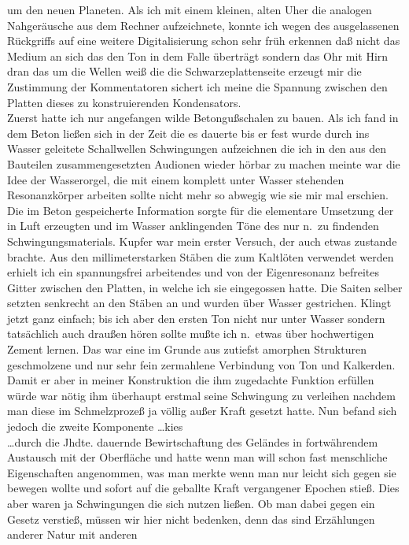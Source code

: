 \documentclass[
]{article}
\begin{document}
um den neuen Planeten. Als ich mit einem kleinen, alten Uher die
analogen Nahgeräusche aus dem Rechner aufzeichnete, konnte ich wegen des
ausgelassenen Rückgriffs auf eine weitere Digitalisierung schon sehr
früh erkennen daß nicht das Medium an sich das den Ton in dem Falle
überträgt sondern das Ohr mit Hirn dran das um die Wellen weiß die die
Schwarzeplattenseite erzeugt mir die Zustimmung der Kommentatoren
sichert ich meine die Spannung zwischen den Platten dieses zu
konstruierenden Kondensators.\\
Zuerst hatte ich nur angefangen wilde Betongußschalen zu bauen. Als ich
fand in dem Beton ließen sich in der Zeit die es dauerte bis er fest
wurde durch ins Wasser geleitete Schallwellen Schwingungen aufzeichnen
die ich in den aus den Bauteilen zusammengesetzten Audionen wieder
hörbar zu machen meinte war die Idee der Wasserorgel, die mit einem
komplett unter Wasser stehenden Resonanzkörper arbeiten sollte nicht
mehr so abwegig wie sie mir mal erschien. Die im Beton gespeicherte
Information sorgte für die elementare Umsetzung der in Luft erzeugten
und im Wasser anklingenden Töne des nur n.~zu findenden
Schwingungsmaterials. Kupfer war mein erster Versuch, der auch etwas
zustande brachte. Aus den millimeterstarken Stäben die zum Kaltlöten
verwendet werden erhielt ich ein spannungsfrei arbeitendes und von der
Eigenresonanz befreites Gitter zwischen den Platten, in welche ich sie
eingegossen hatte. Die Saiten selber setzten senkrecht an den Stäben an
und wurden über Wasser gestrichen. Klingt jetzt ganz einfach; bis ich
aber den ersten Ton nicht nur unter Wasser sondern tatsächlich auch
draußen hören sollte mußte ich n.~etwas über hochwertigen Zement lernen.
Das war eine im Grunde aus zutiefst amorphen Strukturen geschmolzene und
nur sehr fein zermahlene Verbindung von Ton und Kalkerden. Damit er aber
in meiner Konstruktion die ihm zugedachte Funktion erfüllen würde war
nötig ihm überhaupt erstmal seine Schwingung zu verleihen nachdem man
diese im Schmelzprozeß ja völlig außer Kraft gesetzt hatte. Nun befand
sich jedoch die zweite Komponente \ldots kies\\
\ldots durch die Jhdte. dauernde Bewirtschaftung des Geländes in
fortwährendem Austausch mit der Oberfläche und hatte wenn man will schon
fast menschliche Eigenschaften angenommen, was man merkte wenn man nur
leicht sich gegen sie bewegen wollte und sofort auf die geballte Kraft
vergangener Epochen stieß. Dies aber waren ja Schwingungen die sich
nutzen ließen. Ob man dabei gegen ein Gesetz verstieß, müssen wir hier
nicht bedenken, denn das sind Erzählungen anderer Natur mit anderen
\end{document}
